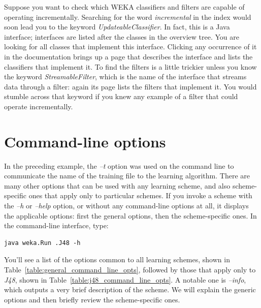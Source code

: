 Suppose you want to check which WEKA classifiers and filters are
capable of operating incrementally. Searching for the word \textit{incremental}
in the index would soon lead you to the keyword
\textit{UpdateableClassifier}. In fact, this is a Java interface; interfaces
are listed after the classes in the overview tree. You are looking for
all classes that implement this interface. Clicking any occurrence of
it in the documentation brings up a page that describes the interface
and lists the classifiers that implement it. To find the filters is a
little trickier unless you know the keyword \textit{StreamableFilter}, which is
the name of the interface that streams data through a filter: again
its page lists the filters that implement it. You would stumble across
that keyword if you knew any example of a filter that could operate
incrementally.

\section{Command-line options}
\label{section:command_line_opts}

In the preceding example, the \textit{--t} option was used on the
command line to communicate the name of the training file to the
learning algorithm. There are many other options that can be used with
any learning scheme, and also scheme-specific ones that apply only to
particular schemes. If you invoke a scheme with the \textit{--h}
or \textit{--help} option, or without any command-line options at all,
it displays the applicable options: first the general options, then
the scheme-specific ones. In the command-line interface, type:

\begin{Verbatim}[fontsize=\footnotesize]
java weka.Run .J48 -h
\end{Verbatim}

\noindent You'll see a list of the options common to all learning schemes, 
shown in Table~\ref{table:general_command_line_opts}, followed by
those that apply only to \textit{J48}, shown in
Table~\ref{table:j48_command_line_opts}. A notable one
is \textit{--info}, which outputs a very brief description of the
scheme. We will explain the generic options and then briefly review
the scheme-specific ones.

